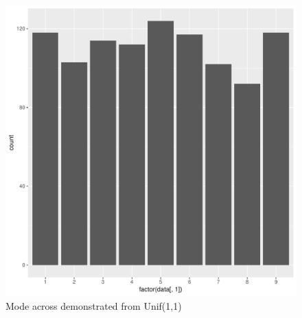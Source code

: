 \documentclass[11pt]{article}
\begin{document}
\begin{enumerate}
\begin{enumerate}
\begin{figure}[H]
	\end{figure}
	\begin{figure}[H]
		\centering
		\caption{Mode across demonstrated from Unif(1,1)}
		\includegraphics[scale=.4]{10graph.pdf}
	\end{figure}
	

\end{enumerate}
\end{enumerate}
\end{document}
